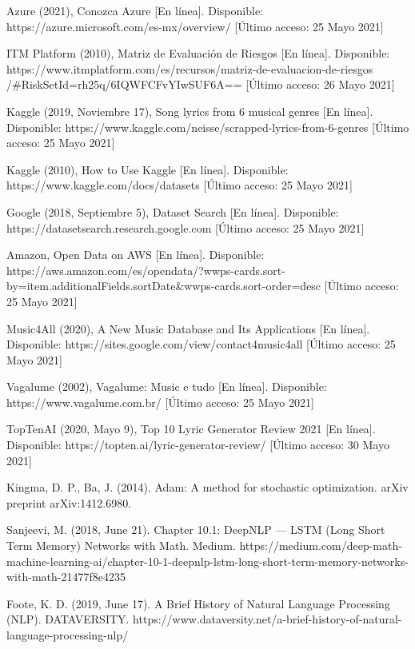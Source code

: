 \documentclass[12pt, a4paper, titlepage]{report}
\begin{document}
\begin{thebibliography}{20}
	Azure (2021), Conozca Azure [En línea]. Disponible: https://azure.microsoft.com/es-mx/overview/ [Último acceso: 25 Mayo 2021]
	
	ITM Platform (2010), Matriz de Evaluación de Riesgos [En línea]. Disponible: https://www.itmplatform.com/es/recursos/matriz-de-evaluacion-de-riesgos
	/\#RiskSetId=rh25q/6IQWFCFvYIwSUF6A== [Último acceso: 26 Mayo 2021]
	
	Kaggle (2019, Noviembre 17), Song lyrics from 6 musical genres [En línea]. Disponible: https://www.kaggle.com/neisse/scrapped-lyrics-from-6-genres [Último acceso: 25 Mayo 2021]
	
	Kaggle (2010), How to Use Kaggle [En línea]. Disponible: https://www.kaggle.com/docs/datasets [Último acceso: 25 Mayo 2021]
	
	Google (2018, Septiembre 5), Dataset Search [En línea]. Disponible: https://datasetsearch.research.google.com [Último acceso: 25 Mayo 2021]
	
	Amazon, Open Data on AWS [En línea]. Disponible: https://aws.amazon.com/es/opendata/?wwps-cards.sort-by=item.additionalFields.sortDate\&wwps-cards.sort-order=desc [Último acceso: 25 Mayo 2021]
	
	Music4All (2020), A New Music Database and Its Applications [En línea]. Disponible: https://sites.google.com/view/contact4music4all [Último acceso: 25 Mayo 2021]
	
	Vagalume (2002), Vagalume: Music e tudo [En línea]. Disponible: https://www.vagalume.com.br/ [Último acceso: 25 Mayo 2021]
	
	TopTenAI (2020, Mayo 9), Top 10 Lyric Generator Review 2021 [En línea]. Disponible: https://topten.ai/lyric-generator-review/ [Último acceso: 30 Mayo 2021]
	
	Kingma, D. P., Ba, J. (2014). Adam: A method for stochastic optimization. arXiv preprint arXiv:1412.6980.
	
	Sanjeevi, M. (2018, June 21). Chapter 10.1: DeepNLP — LSTM (Long Short Term Memory) Networks with Math. Medium. https://medium.com/deep-math-machine-learning-ai/chapter-10-1-deepnlp-lstm-long-short-term-memory-networks-with-math-21477f8e4235
	 
	Foote, K. D. (2019, June 17). A Brief History of Natural Language Processing (NLP). DATAVERSITY. https://www.dataversity.net/a-brief-history-of-natural-language-processing-nlp/
	 

\end{thebibliography}
\end{document}

